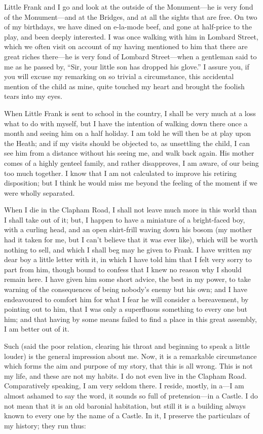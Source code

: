 Little Frank and I go and look at the outside of the Monument---he is
very fond of the Monument---and at the Bridges, and at all the sights
that are free.  On two of my birthdays, we have dined on e-la-mode
beef, and gone at half-price to the play, and been deeply
interested.  I was once walking with him in Lombard Street, which we
often visit on account of my having mentioned to him that there are
great riches there---he is very fond of Lombard Street---when a
gentleman said to me as he passed by, ``Sir, your little son has
dropped his glove.''  I assure you, if you will excuse my remarking
on so trivial a circumstance, this accidental mention of the child
as mine, quite touched my heart and brought the foolish tears into
my eyes.

When Little Frank is sent to school in the country, I shall be very
much at a loss what to do with myself, but I have the intention of
walking down there once a month and seeing him on a half holiday.  I
am told he will then be at play upon the Heath; and if my visits
should be objected to, as unsettling the child, I can see him from a
distance without his seeing me, and walk back again.  His mother
comes of a highly genteel family, and rather disapproves, I am
aware, of our being too much together.  I know that I am not
calculated to improve his retiring disposition; but I think he would
miss me beyond the feeling of the moment if we were wholly
separated.

When I die in the Clapham Road, I shall not leave much more in this
world than I shall take out of it; but, I happen to have a miniature
of a bright-faced boy, with a curling head, and an open shirt-frill
waving down his bosom (my mother had it taken for me, but I can't
believe that it was ever like), which will be worth nothing to sell,
and which I shall beg may he given to Frank.  I have written my dear
boy a little letter with it, in which I have told him that I felt
very sorry to part from him, though bound to confess that I knew no
reason why I should remain here.  I have given him some short
advice, the best in my power, to take warning of the consequences of
being nobody's enemy but his own; and I have endeavoured to comfort
him for what I fear he will consider a bereavement, by pointing out
to him, that I was only a superfluous something to every one but
him; and that having by some means failed to find a place in this
great assembly, I am better out of it.

Such (said the poor relation, clearing his throat and beginning to
speak a little louder) is the general impression about me.  Now, it
is a remarkable circumstance which forms the aim and purpose of my
story, that this is all wrong.  This is not my life, and these are
not my habits.  I do not even live in the Clapham Road.
Comparatively speaking, I am very seldom there.  I reside, mostly,
in a---I am almost ashamed to say the word, it sounds so full of
pretension---in a Castle.  I do not mean that it is an old baronial
habitation, but still it is a building always known to every one by
the name of a Castle.  In it, I preserve the particulars of my
history; they run thus:

